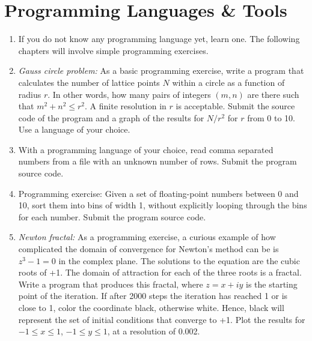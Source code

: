 \documentclass{article}
\begin{document}
\newpage
\section{Programming Languages \& Tools}

\begin{enumerate}

\item If you do not know any programming language yet, learn one. The following chapters will involve simple programming exercises. 

  
\item {\it Gauss circle problem:}
  As a basic programming exercise, write a program that calculates the number of lattice points $N$ within a circle as a function of radius $r$.
In other words, how many pairs of integers $(m,n)$ are there such that $m^2+n^2 \leq  r^2$.
A finite resolution in $r$ is acceptable. Submit the source code of the program and a graph of the results for $N/r^2$ for $r$ from 0 to 10.
Use a language of your choice.

\item 
With a programming language of your choice, read comma separated numbers from a file with an unknown number of rows.
Submit the program source code.


\item
Programming exercise: Given a set of floating-point numbers between 0 and 10, sort them into bins of width 1, without explicitly looping through the bins for each number. Submit the program source code.


\item {\it Newton fractal:}  \label{exrc:fractal}
As a programming exercise, a curious example of how complicated the domain of convergence for Newton's method can be is $z^3-1=0$ in the complex plane.  The solutions to the equation are the cubic roots of +1.  The domain of attraction for each of the three roots is a fractal. Write a program that produces this fractal, where $z=x+iy$ is the starting point of the iteration. If after 2000 steps the iteration has reached 1 or is close to 1, color the coordinate black, otherwise white. Hence, black will represent the set of initial conditions that converge to +1. Plot the results for $-1\leq x \leq 1$, $-1\leq y \leq1$, at a resolution of 0.002.


\end{enumerate}
\end{document}
